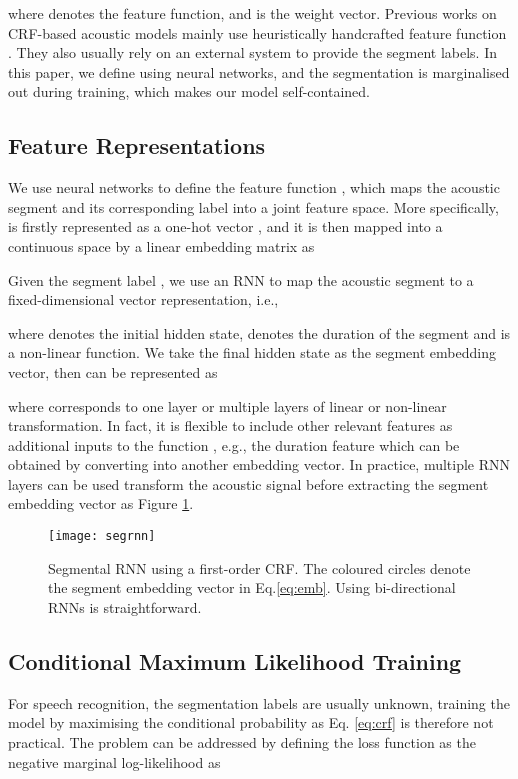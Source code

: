 \documentclass[a4paper]{article}
\begin{document}
where  denotes the feature function, and  is the weight vector. Previous works on CRF-based acoustic models mainly use heuristically handcrafted feature function . They also usually rely on an external system to provide the segment labels. In this paper, we define  using neural networks, and the segmentation  is marginalised out during training, which makes our model self-contained. 

\subsection{Feature Representations}

We use neural networks to define the feature function , which maps the acoustic segment and its corresponding label into a joint feature space. More specifically,  is firstly represented as a one-hot vector , and it is then mapped into a continuous space by a linear embedding matrix  as

Given the segment label , we use an RNN to map the acoustic segment to a fixed-dimensional vector representation,  i.e.,

where  denotes the initial hidden state,  denotes the duration of the segment and  is a non-linear function. We take the final hidden state  as the segment embedding vector, then  can be represented as 

where  corresponds to one layer or multiple layers of linear or non-linear transformation. In fact, it is flexible to include other relevant features as additional inputs to the function , e.g., the duration feature which can be obtained by converting  into another embedding vector. In practice, multiple RNN layers can be used transform the acoustic signal  before extracting the segment embedding vector  as Figure \ref{fig:segrnn}. 

\begin{figure}[t]
\small
\centerline{\texttt{[image: segrnn]}} \vskip -4mm
\caption{Segmental RNN using a first-order CRF. The coloured circles denote the segment embedding vector  in Eq.\eqref{eq:emb}. Using bi-directional RNNs is straightforward. }  
\label{fig:segrnn}
\vskip -5mm
\end{figure}

\subsection{Conditional Maximum Likelihood Training}

For speech recognition, the segmentation labels  are usually unknown,  training the model by maximising the conditional probability as Eq. \eqref{eq:crf} is therefore not practical. The problem can be addressed by defining the loss function as the negative marginal log-likelihood as
\end{document}
